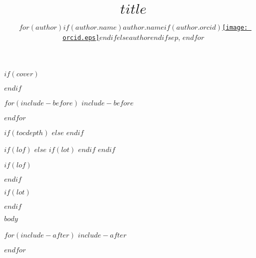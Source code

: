 \documentclass[twoside]{extreport}
\title{$title$}
\author{
$for(author)$$if(author.name)$$author.name$$if(author.orcid)$\href{https://orcid.org/$author.orcid$}{\texttt{[image: orcid.eps]}}$endif$$else$$author$$endif$$sep$, $endfor$
}
\begin{document}
$if(cover)$

$endif$
\maketitle
{}

$for(include-before)$
$include-before$

$endfor$


\clearpage

$if(tocdepth)$
\setcounter{tocdepth}{$tocdepth$}
$else$
\setcounter{tocdepth}{3}
$endif$
\tableofcontents
{}

$if(lof)$
\clearpage
$else$
  $if(lot)$
\clearpage
  $endif$
$endif$

$if(lof)$
\listoffigures
{}
\vspace{34pt}
$endif$

$if(lot)$
\listoftables
{}
$endif$

\clearpage


$body$

$for(include-after)$
$include-after$

$endfor$
\end{document}
